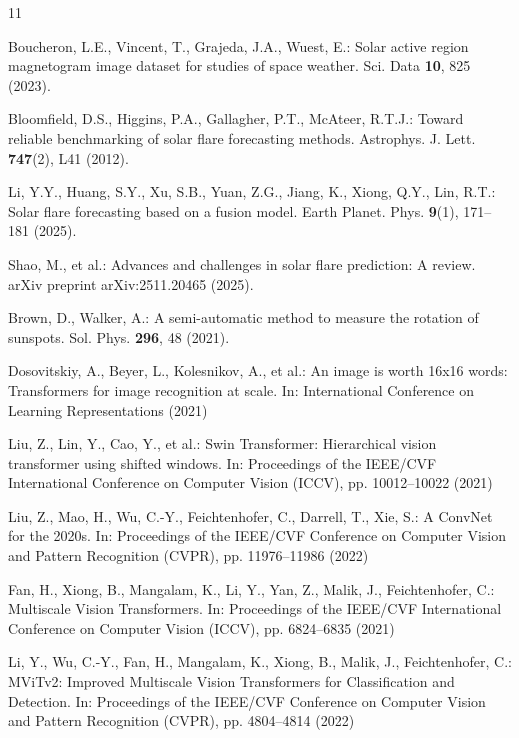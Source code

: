\documentclass[runningheads]{llncs}
\begin{document}
\begin{thebibliography}{11}

Boucheron, L.E., Vincent, T., Grajeda, J.A., Wuest, E.: Solar active region magnetogram image dataset for studies of space weather. Sci. Data \textbf{10}, 825 (2023). 

Bloomfield, D.S., Higgins, P.A., Gallagher, P.T., McAteer, R.T.J.: Toward reliable benchmarking of solar flare forecasting methods. Astrophys. J. Lett. \textbf{747}(2), L41 (2012). 

Li, Y.Y., Huang, S.Y., Xu, S.B., Yuan, Z.G., Jiang, K., Xiong, Q.Y., Lin, R.T.: Solar flare forecasting based on a fusion model. Earth Planet. Phys. \textbf{9}(1), 171--181 (2025). 

Shao, M., et al.: Advances and challenges in solar flare prediction: A review. arXiv preprint arXiv:2511.20465 (2025). 

Brown, D., Walker, A.: A semi-automatic method to measure the rotation of sunspots. Sol. Phys. \textbf{296}, 48 (2021). 

Dosovitskiy, A., Beyer, L., Kolesnikov, A., et al.: An image is worth 16x16 words: Transformers for image recognition at scale. In: International Conference on Learning Representations (2021)

Liu, Z., Lin, Y., Cao, Y., et al.: Swin Transformer: Hierarchical vision transformer using shifted windows. In: Proceedings of the IEEE/CVF International Conference on Computer Vision (ICCV), pp. 10012--10022 (2021)

Liu, Z., Mao, H., Wu, C.-Y., Feichtenhofer, C., Darrell, T., Xie, S.: A ConvNet for the 2020s. In: Proceedings of the IEEE/CVF Conference on Computer Vision and Pattern Recognition (CVPR), pp. 11976--11986 (2022)

Fan, H., Xiong, B., Mangalam, K., Li, Y., Yan, Z., Malik, J., Feichtenhofer, C.: Multiscale Vision Transformers. In: Proceedings of the IEEE/CVF International Conference on Computer Vision (ICCV), pp. 6824--6835 (2021)

Li, Y., Wu, C.-Y., Fan, H., Mangalam, K., Xiong, B., Malik, J., Feichtenhofer, C.: MViTv2: Improved Multiscale Vision Transformers for Classification and Detection. In: Proceedings of the IEEE/CVF Conference on Computer Vision and Pattern Recognition (CVPR), pp. 4804--4814 (2022)



\end{thebibliography}
\end{document}
